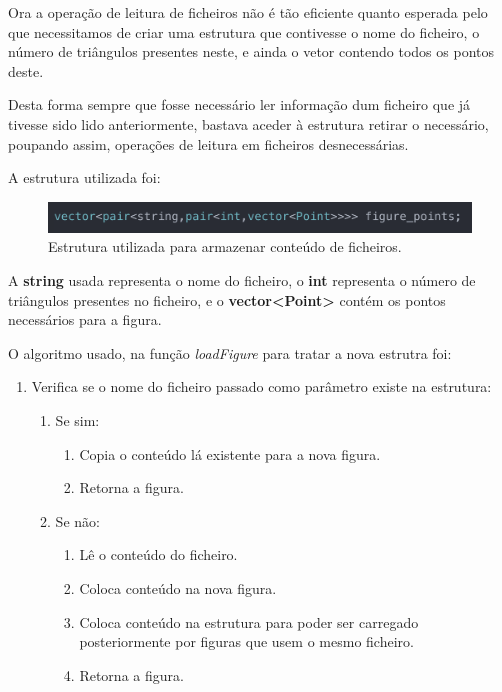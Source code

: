 \documentclass[a4paper]{article}
\begin{document}
Ora a operação de leitura de ficheiros não é tão eficiente quanto esperada pelo que necessitamos de criar uma estrutura que contivesse o nome do ficheiro, o número de triângulos presentes neste, e ainda o vetor contendo todos os pontos deste.

Desta forma sempre que fosse necessário ler informação dum ficheiro que já tivesse sido lido anteriormente, bastava aceder à estrutura retirar o necessário, poupando assim, operações de leitura em ficheiros desnecessárias.

A estrutura utilizada foi:

\begin{figure}[H]
\centering
\includegraphics[scale=0.6]{optimized_struct.png}
\caption{Estrutura utilizada para armazenar conteúdo de ficheiros.}
\label{img:optimized_struct}
\end{figure}

A \textbf{string} usada representa o nome do ficheiro, o \textbf{int} representa o número de triângulos presentes no ficheiro, e o \textbf{vector<Point>} contém os pontos necessários para a figura.

\vspace{1.0cm}

O algoritmo usado, na função \textit{loadFigure} para tratar a nova estrutra foi:

\ttfamily
\begin{enumerate}
  \item Verifica se o nome do ficheiro passado como parâmetro existe na estrutura:
  \begin{enumerate}
  	\item Se sim:
	\begin{enumerate}
		\item Copia o conteúdo lá existente para a nova figura.
		\item Retorna a figura.
	\end{enumerate}
	\item Se não:
	\begin{enumerate}
		\item Lê o conteúdo do ficheiro.
		\item Coloca conteúdo na nova figura.
		\item Coloca conteúdo na estrutura para poder ser carregado posteriormente por figuras que usem o mesmo ficheiro.
		\item Retorna a figura.
	 \end{enumerate}
  \end{enumerate}

\end{enumerate}
\rmfamily
\end{document}
